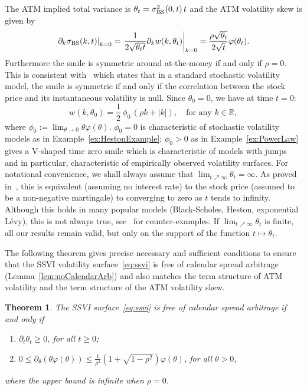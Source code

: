 \documentclass[12pt]{article}
\newtheorem{theorem}{Theorem}[section]
\numberwithin{equation}{section}
\newcommand{\BS}{\rm BS}
\newcommand{\p}{\partial}
\newcommand{\beq}{\begin{equation}}
\newcommand{\eeq}{\end{equation}}
\begin{document}
The ATM implied total variance is $\theta_t=\sigma^2_{\BS}(0,t)\,t$ and the ATM volatility skew is given by
\begin{equation}\label{eq:ATMVolSkew}
\left.\partial_k \sigma_{\BS}(k,t)\right|_{k=0}
=\left.\frac{1}{2\sqrt{\theta_t t}}\p_k w(k,\theta_t)\right|_{k=0}
=\frac{\rho\sqrt{\theta_t}}{2\sqrt{t}}\varphi(\theta_t).
\end{equation}
Furthermore the smile is symmetric around at-the-money if and only if $\rho=0$.
This is consistent with~\cite[Theorem 3.4]{CarrLee} which states that in a standard stochastic volatility model,
the smile is symmetric if and only if the correlation between the stock price and its instantaneous volatility is null.
Since $\theta_0=0$, we have at time $t=0$:
\beq
w(k,\theta_0)=\frac{1}{2}\,\phi_0\,\left(\rho k+|k|\right), \quad\text{for any }k\in\mathbb{R},
\label{eq:timeZeroSmile}
\eeq
where $\phi_0:=\lim_{\theta\to 0}\theta\varphi(\theta)$.
$\phi_0=0$ is characteristic of stochastic volatility models as in Example~\ref{ex:HestonExample};
$\phi_0>0$ as in Example~\ref{ex:PowerLaw} gives a V-shaped time zero smile which is characteristic of models with jumps and in particular, characteristic of empirically observed volatility surfaces.
For notational convenience, we shall always assume that $\lim_{t\nearrow\infty}\theta_t=\infty$.
As proved in~\cite{RT10}, this is equivalent (assuming no interest rate) to the stock price 
(assumed to be a non-negative martingale) to converging to zero as $t$ tends to infinity.
Although this holds in many popular models (Black-Scholes, Heston, exponential L\'evy), 
this is not always true, see~\cite{Hobson} for counter-examples.
If $\lim_{t\nearrow\infty}\theta_t$ is finite, all our results remain valid, but only on the support of 
the function $t\mapsto \theta_t$.


The following theorem gives precise necessary and sufficient conditions to ensure that the SSVI volatility surface~\eqref{eq:ssvi}
is free of calendar spread arbitrage (Lemma~\ref{lem:noCalendarArb})
and also matches the term structure of ATM volatility and the term structure of the ATM volatility skew.
\begin{theorem}\label{thm:arbitrarySkew}
The SSVI surface~\eqref{eq:ssvi} is free of calendar spread arbitrage if and only if 
\begin{enumerate}
\item $\partial_t \theta_t \geq 0$\label{item:increasingTotVar}, for all $t\geq 0$;
\item $0\leq \partial_\theta (\theta \varphi(\theta))  \leq 
\frac{1}{\rho^2}\left(1+\sqrt{1-\rho^2}\right)\varphi(\theta)$, for all $\theta>0$,
\end{enumerate}
where the upper bound is infinite when $\rho=0$.
\end{theorem}
\end{document}

